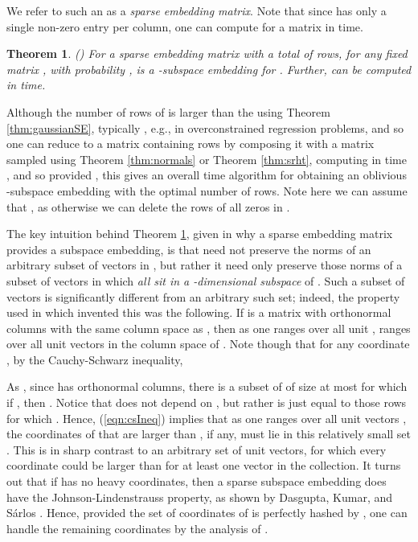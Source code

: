\documentclass[11pt]{article}
\newtheorem{theorem}{Theorem}
\begin{document}
We refer to such an  as a {\em sparse embedding matrix}. Note that since  has only a single non-zero
entry per column, one can compute  for a matrix  in  time. 
\begin{theorem}\label{thm:cw}(\cite{CW13})
For  a sparse embedding matrix with a total of  rows, for any fixed 
matrix , with probability ,  is a  -subspace embedding for . Further,
 can be computed in  time. 
\end{theorem}
Although the number of rows of  is larger than the  using Theorem \ref{thm:gaussianSE}, 
typically , e.g., in overconstrained regression problems, and so one can reduce 
to a matrix containing  rows by composing it with a matrix  sampled using Theorem \ref{thm:normals}
or Theorem \ref{thm:srht},
computing  in time , and so provided , 
this gives an overall  time algorithm for obtaining an oblivious  -subspace embedding
with the optimal  number of rows. Note here we can assume that 
, as otherwise we can delete the rows of all zeros in . 

The key intuition behind Theorem \ref{thm:cw}, given in \cite{CW13} 
why a sparse embedding matrix provides a subspace embedding, is 
that  need not preserve the norms
of an arbitrary subset of  vectors in , but rather it need only preserve those norms
of a subset of  vectors in  which {\it all sit in a -dimensional subspace} of 
. Such a subset of  vectors is significantly different from an arbitrary such set; 
indeed, the property used in \cite{CW13} which invented this was the following. 
If  is a matrix
with orthonormal columns with the same column space as , then as one ranges over all unit , 
 ranges over all unit vectors in the column space of . Note though that for any coordinate , by the
Cauchy-Schwarz inequality, 

As , since  has orthonormal columns, there is a subset 
 of  of size at most  for which if , then . Notice that  does not
depend on , but rather is just equal to those rows  for which . Hence,  
(\ref{eqn:csIneq}) implies that as one ranges over all unit
vectors , the coordinates of  that are larger than , if any, must lie in this relatively
small set . This
is in sharp contrast to an arbitrary set of  unit vectors, for which every coordinate could be larger than 
 for at least one vector in the collection. It turns out that if  has no heavy coordinates, then a
sparse subspace embedding does have the Johnson-Lindenstrauss property, 
as shown by Dasgupta, Kumar, and S\'arlos \cite{dks10}.
Hence, provided the set of coordinates of  is perfectly hashed by , one can handle the remaining coordinates
by the analysis of \cite{dks10}. 
\end{document}
